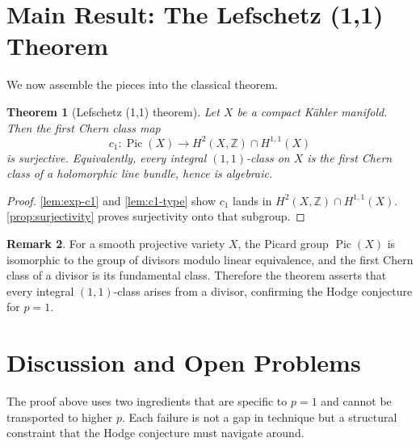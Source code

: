 \documentclass[12pt]{article}
\theoremstyle{plain}
\newtheorem{theorem}{Theorem}[section]
\theoremstyle{definition}
\newtheorem{remark}[theorem]{Remark}
\begin{document}
\section{Main Result: The Lefschetz (1,1) Theorem}

We now assemble the pieces into the classical theorem.

\begin{theorem}[Lefschetz (1,1) theorem]
Let $X$ be a compact K\"ahler manifold. 
Then the first Chern class map
\[
c_1: \operatorname{Pic}(X) \longrightarrow H^2(X,\mathbb Z) \cap H^{1,1}(X)
\]
is surjective. 
Equivalently, every integral $(1,1)$-class on $X$ is the first Chern class of a holomorphic line bundle, hence is algebraic.
\end{theorem}

\begin{proof}
\cref{lem:exp-c1} and \cref{lem:c1-type} show $c_1$ lands in $H^2(X,\mathbb Z) \cap H^{1,1}(X)$. 
\cref{prop:surjectivity} proves surjectivity onto that subgroup.
\end{proof}

\begin{remark}
For a smooth projective variety $X$, the Picard group $\operatorname{Pic}(X)$ is isomorphic to the group of divisors modulo linear equivalence, and the first Chern class of a divisor is its fundamental class. 
Therefore the theorem asserts that every integral $(1,1)$-class arises from a divisor, confirming the Hodge conjecture for $p=1$.
\end{remark}

\section{Discussion and Open Problems}

The proof above uses two ingredients that are specific to $p=1$ and cannot be transported to higher $p$. 
Each failure is not a gap in technique but a structural constraint that the Hodge conjecture must navigate around.
\end{document}
